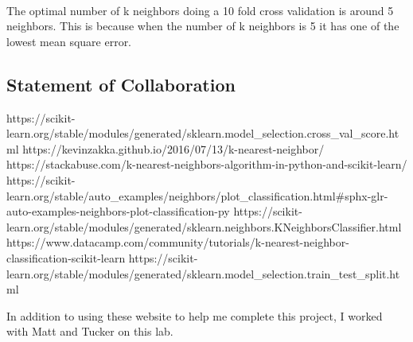 \documentclass[11pt]{article}
\begin{document}
    \begin{center}
    \end{center}
    { \hspace*{\fill} \\}
    
    The optimal number of k neighbors doing a 10 fold cross validation is
around 5 neighbors. This is because when the number of k neighbors is 5
it has one of the lowest mean square error.

    \subsection{Statement of
Collaboration}\label{statement-of-collaboration}

    https://scikit-learn.org/stable/modules/generated/sklearn.model\_selection.cross\_val\_score.html
https://kevinzakka.github.io/2016/07/13/k-nearest-neighbor/
https://stackabuse.com/k-nearest-neighbors-algorithm-in-python-and-scikit-learn/
https://scikit-learn.org/stable/auto\_examples/neighbors/plot\_classification.html\#sphx-glr-auto-examples-neighbors-plot-classification-py
https://scikit-learn.org/stable/modules/generated/sklearn.neighbors.KNeighborsClassifier.html
https://www.datacamp.com/community/tutorials/k-nearest-neighbor-classification-scikit-learn
https://scikit-learn.org/stable/modules/generated/sklearn.model\_selection.train\_test\_split.html

In addition to using these website to help me complete this project, I
worked with Matt and Tucker on this lab.


    
    
    
    
\end{document}

